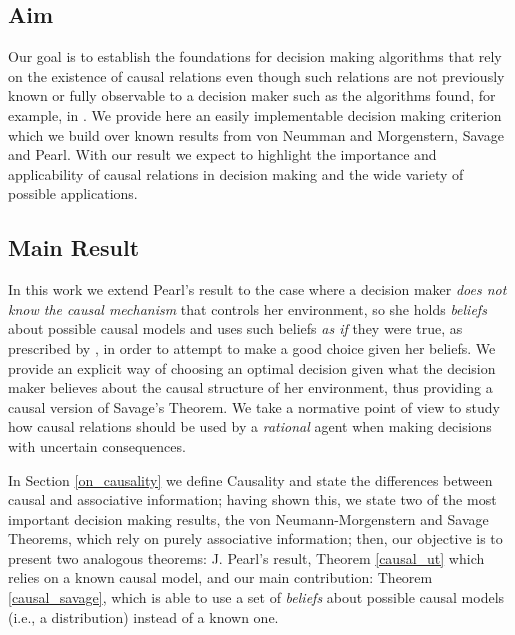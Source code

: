 \documentclass{svjour3}                     %
\begin{document}
\subsection{Aim}
Our goal is to establish the foundations for decision making algorithms that rely on the existence of causal relations even though such relations are not previously known or fully observable to a decision maker such as the algorithms found, for example, in \citep{bareinboim2015bandits,lattimoreNIPS2016,sen2017identifying, gonzalez2018playing}. We provide here an easily implementable decision making criterion which we build over known results from von Neumman and Morgenstern, Savage and Pearl. With our result we expect to highlight the importance and applicability of causal relations in decision making and the wide variety of possible applications.

\subsection{Main Result}
In this work we extend Pearl's result to the case where a decision maker \textit{does not know the causal mechanism} that controls her environment, so she holds \textit{beliefs} about possible causal models and uses such beliefs \textit{as if} they were true, as prescribed by \cite{joyce1999foundations}, in order to attempt to make a good choice given her beliefs. We provide an explicit way of choosing an optimal decision given what the decision maker believes about the causal structure of her environment, thus providing a causal version of Savage's Theorem. We take a normative point of view to study how causal relations should be used by a \textit{rational} agent when making decisions with uncertain consequences. 

In Section \ref{on_causality} we define Causality and state the differences between causal and associative information; having shown this, we state two of the most important decision making results, the von Neumann-Morgenstern and Savage Theorems, which rely on purely associative information; then, our objective is to present two analogous theorems: J. Pearl's result, Theorem \ref{causal_ut} which relies on a known causal model, and our main contribution: Theorem \ref{causal_savage}, which is able to use a set of \textit{beliefs} about possible causal models (i.e., a distribution) instead of a known one.
\end{document}
